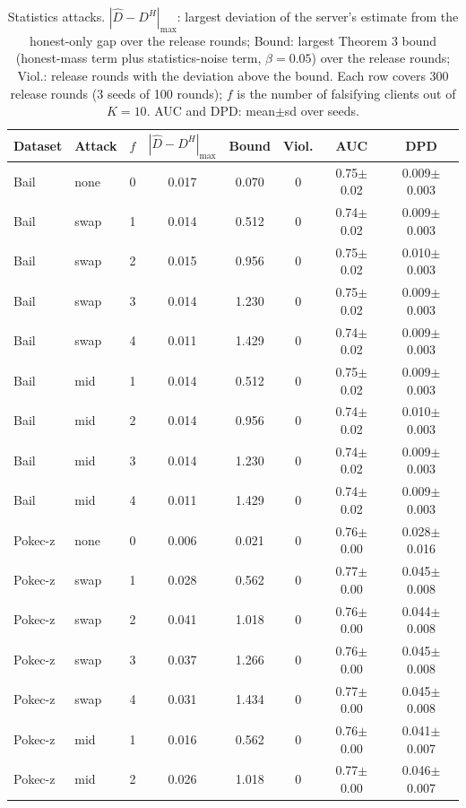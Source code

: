 \begin{table}[t]
\centering
\footnotesize
\caption{Statistics attacks. $|\widehat{D}-D^H|_{\max}$: largest deviation of the server's estimate from the honest-only gap over the release rounds; Bound: largest Theorem 3 bound (honest-mass term plus statistics-noise term, $\beta=0.05$) over the release rounds; Viol.: release rounds with the deviation above the bound. Each row covers 300 release rounds (3 seeds of 100 rounds); $f$ is the number of falsifying clients out of $K=10$. AUC and DPD: mean$\pm$sd over seeds.}
\label{tab:e4_stat_attacks}
\begin{tabular}{llcccccc}
\toprule
Dataset & Attack & $f$ & $|\widehat{D}-D^H|_{\max}$ & Bound & Viol. & AUC & DPD \\
\midrule
Bail & none & 0 & 0.017 & 0.070 & 0 & 0.75$\pm$0.02 & 0.009$\pm$0.003 \\
Bail & swap & 1 & 0.014 & 0.512 & 0 & 0.74$\pm$0.02 & 0.009$\pm$0.003 \\
Bail & swap & 2 & 0.015 & 0.956 & 0 & 0.75$\pm$0.02 & 0.010$\pm$0.003 \\
Bail & swap & 3 & 0.014 & 1.230 & 0 & 0.75$\pm$0.02 & 0.009$\pm$0.003 \\
Bail & swap & 4 & 0.011 & 1.429 & 0 & 0.74$\pm$0.02 & 0.009$\pm$0.003 \\
Bail & mid & 1 & 0.014 & 0.512 & 0 & 0.75$\pm$0.02 & 0.009$\pm$0.003 \\
Bail & mid & 2 & 0.014 & 0.956 & 0 & 0.74$\pm$0.02 & 0.010$\pm$0.003 \\
Bail & mid & 3 & 0.014 & 1.230 & 0 & 0.74$\pm$0.02 & 0.009$\pm$0.003 \\
Bail & mid & 4 & 0.011 & 1.429 & 0 & 0.74$\pm$0.02 & 0.009$\pm$0.003 \\
Pokec-z & none & 0 & 0.006 & 0.021 & 0 & 0.76$\pm$0.00 & 0.028$\pm$0.016 \\
Pokec-z & swap & 1 & 0.028 & 0.562 & 0 & 0.77$\pm$0.00 & 0.045$\pm$0.008 \\
Pokec-z & swap & 2 & 0.041 & 1.018 & 0 & 0.76$\pm$0.00 & 0.044$\pm$0.008 \\
Pokec-z & swap & 3 & 0.037 & 1.266 & 0 & 0.76$\pm$0.00 & 0.045$\pm$0.008 \\
Pokec-z & swap & 4 & 0.031 & 1.434 & 0 & 0.77$\pm$0.00 & 0.045$\pm$0.008 \\
Pokec-z & mid & 1 & 0.016 & 0.562 & 0 & 0.76$\pm$0.00 & 0.041$\pm$0.007 \\
Pokec-z & mid & 2 & 0.026 & 1.018 & 0 & 0.77$\pm$0.00 & 0.046$\pm$0.007 \\

\end{tabular}
\end{table}
